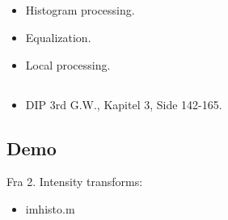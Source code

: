 \subsection{\subtopics}

\begin{itemize}
	\item Histogram processing.
	\item Equalization.
	\item Local processing.
\end{itemize}

\subsection{\curriculum}

\begin{itemize}
	\item DIP 3rd G.W., Kapitel 3, Side 142-165.
\end{itemize}

\subsection{Demo}

Fra 2. Intensity transforms:

\begin{itemize}
	\item imhisto.m
\end{itemize}

